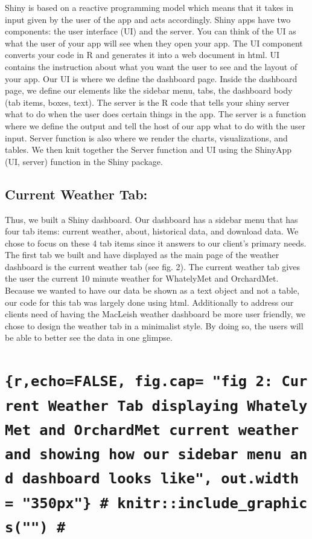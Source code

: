 \documentclass[10pt,letterpaper]{article}
\begin{document}
Shiny is based on a reactive programming model which means that it takes
in input given by the user of the app and acts accordingly. Shiny apps
have two components: the user interface (UI) and the server. You can
think of the UI as what the user of your app will see when they open
your app. The UI component converts your code in R and generates it into
a web document in html. UI contains the instruction about what you want
the user to see and the layout of your app. Our UI is where we define
the dashboard page. Inside the dashboard page, we define our elements
like the sidebar menu, tabs, the dashboard body (tab items, boxes,
text). The server is the R code that tells your shiny server what to do
when the user does certain things in the app. The server is a function
where we define the output and tell the host of our app what to do with
the user input. Server function is also where we render the charts,
visualizations, and tables. We then knit together the Server function
and UI using the ShinyApp (UI, server) function in the Shiny package.

\subsection{Current Weather Tab:}\label{current-weather-tab}

Thus, we built a Shiny dashboard. Our dashboard has a sidebar menu that
has four tab items: current weather, about, historical data, and
download data. We chose to focus on these 4 tab items since it answers
to our client's primary needs. The first tab we built and have displayed
as the main page of the weather dashboard is the current weather tab
(see fig. 2). The current weather tab gives the user the current 10
minute weather for WhatelyMet and OrchardMet. Because we wanted to have
our data be shown as a text object and not a table, our code for this
tab was largely done using html. Additionally to address our clients
need of having the MacLeish weather dashboard be more user friendly, we
chose to design the weather tab in a minimalist style. By doing so, the
users will be able to better see the data in one glimpse.

\section{\texorpdfstring{\texttt{\{r,echo=FALSE,\ fig.cap=\ "fig\ 2:\ Current\ Weather\ Tab\ displaying\ WhatelyMet\ and\ OrchardMet\ current\ weather\ and\ showing\ how\ our\ sidebar\ menu\ and\ dashboard\ looks\ like",\ out.width\ =\ "350px"\}\ \#\ knitr::include\_graphics("")\ \#}}{\{r,echo=FALSE, fig.cap= "fig 2: Current Weather Tab displaying WhatelyMet and OrchardMet current weather and showing how our sidebar menu and dashboard looks like", out.width = "350px"\} \# knitr::include\_graphics("") \#}}\label{rechofalse-fig.cap-fig-2-current-weather-tab-displaying-whatelymet-and-orchardmet-current-weather-and-showing-how-our-sidebar-menu-and-dashboard-looks-like-out.width-350px-knitrinclude_graphics}
\end{document}
